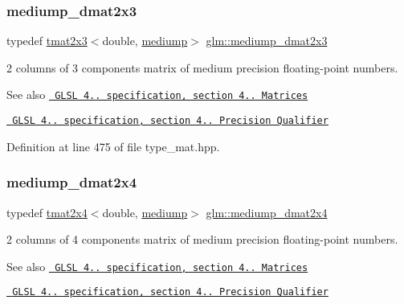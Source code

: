 \subsubsection{\texorpdfstring{mediump\_dmat2x3}{mediump\_dmat2x3}}
{\footnotesize\ttfamily typedef \mbox{\hyperlink{structglm_1_1tmat2x3}{tmat2x3}}$<$double, \mbox{\hyperlink{namespaceglm_a0f04f086094c747d227af4425893f545a6416f3ea0c9025fb21ed50c4d6620482}{mediump}}$>$ \mbox{\hyperlink{group__core__precision_ga0b187380697f66a25000b307db9cb41a}{glm\+::mediump\+\_\+dmat2x3}}}

2 columns of 3 components matrix of medium precision floating-\/point numbers.

\begin{DoxySeeAlso}{See also}
\href{http://www.opengl.org/registry/doc/GLSLangSpec.4.20.8.pdf}{\texttt{ G\+L\+SL 4.. specification, section 4.. Matrices}} 

\href{http://www.opengl.org/registry/doc/GLSLangSpec.4.20.8.pdf}{\texttt{ G\+L\+SL 4.. specification, section 4.. Precision Qualifier}} 
\end{DoxySeeAlso}


Definition at line 475 of file type\+\_\+mat.\+hpp.

\mbox{\label{group__core__precision_ga837b8ead9807e10740dddfc99dabe8d7}} 
\subsubsection{\texorpdfstring{mediump\_dmat2x4}{mediump\_dmat2x4}}
{\footnotesize\ttfamily typedef \mbox{\hyperlink{structglm_1_1tmat2x4}{tmat2x4}}$<$double, \mbox{\hyperlink{namespaceglm_a0f04f086094c747d227af4425893f545a6416f3ea0c9025fb21ed50c4d6620482}{mediump}}$>$ \mbox{\hyperlink{group__core__precision_ga837b8ead9807e10740dddfc99dabe8d7}{glm\+::mediump\+\_\+dmat2x4}}}

2 columns of 4 components matrix of medium precision floating-\/point numbers.

\begin{DoxySeeAlso}{See also}
\href{http://www.opengl.org/registry/doc/GLSLangSpec.4.20.8.pdf}{\texttt{ G\+L\+SL 4.. specification, section 4.. Matrices}} 

\href{http://www.opengl.org/registry/doc/GLSLangSpec.4.20.8.pdf}{\texttt{ G\+L\+SL 4.. specification, section 4.. Precision Qualifier}} 
\end{DoxySeeAlso}


